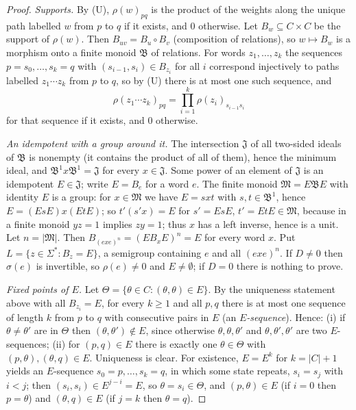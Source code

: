 \begin{proof}
\emph{Supports.} By (U), $\rho(w)_{pq}$ is the product of the weights along the unique path labelled
$w$ from $p$ to $q$ if it exists, and $0$ otherwise. Let $B_w\subseteq C\times C$ be the support of
$\rho(w)$. Then $B_{uv}=B_u\circ B_v$ (composition of relations), so $w\mapsto B_w$ is a morphism
onto a finite monoid $\mathfrak B$ of relations. For words $z_1,\ldots,z_k$ the sequences
$p=s_0,\ldots,s_k=q$ with $(s_{i-1},s_i)\in B_{z_i}$ for all $i$ correspond injectively to paths
labelled $z_1\cdots z_k$ from $p$ to $q$, so by (U) there is at most one such sequence, and
\begin{equation}\label{eq:singleterm}
\rho(z_1\cdots z_k)_{pq}=\textstyle\prod_{i=1}^k\rho(z_i)_{s_{i-1}s_i}
\end{equation}
for that sequence if it exists, and $0$ otherwise.

\emph{An idempotent with a group around it.} The intersection $\mathfrak J$ of all two-sided ideals of
$\mathfrak B$ is nonempty (it contains the product of all of them), hence the minimum ideal, and
$\mathfrak B^1x\mathfrak B^1=\mathfrak J$ for every $x\in\mathfrak J$. Some power of an element of
$\mathfrak J$ is an idempotent $E\in\mathfrak J$; write $E=B_e$ for a word $e$. The finite monoid
$\mathfrak M=E\mathfrak BE$ with identity $E$ is a group: for $x\in\mathfrak M$ we have
$E=sxt$ with $s,t\in\mathfrak B^1$, hence $E=(EsE)x(EtE)$; so $t'(s'x)=E$ for
$s'=EsE$, $t'=EtE\in\mathfrak M$, because in a finite monoid $yz=1$ implies $zy=1$; thus $x$ has a
left inverse, hence is a unit. Let $n=|\mathfrak M|$. Then $B_{(exe)^n}=(EB_xE)^n=E$ for every word
$x$. Put $L=\{z\in\Sigma^*:B_z=E\}$, a semigroup containing $e$ and all $(exe)^n$. If $D\ne0$ then
$\sigma(e)$ is invertible, so $\rho(e)\ne0$ and $E\ne\emptyset$; if $D=0$ there is nothing to prove.

\emph{Fixed points of $E$.} Let $\Theta=\{\theta\in C:(\theta,\theta)\in E\}$. By the uniqueness statement above with
all $B_{z_i}=E$, for every $k\ge1$ and all $p,q$ there is at most one sequence of length $k$ from $p$
to $q$ with consecutive pairs in $E$ (an \emph{$E$-sequence}). Hence:
(i) if $\theta\ne\theta'$ are in $\Theta$ then $(\theta,\theta')\notin E$, since otherwise $\theta,\theta,\theta'$ and $\theta,\theta',\theta'$ are two
$E$-sequences;
(ii) for $(p,q)\in E$ there is exactly one $\theta\in\Theta$ with $(p,\theta),(\theta,q)\in E$. Uniqueness is clear.
For existence, $E=E^{k}$ for $k=|C|+1$ yields an $E$-sequence $s_0=p,\ldots,s_k=q$, in which some
state repeats, $s_i=s_j$ with $i<j$; then $(s_i,s_i)\in E^{j-i}=E$, so $\theta=s_i\in\Theta$, and
$(p,\theta)\in E$ (if $i=0$ then $p=\theta$) and $(\theta,q)\in E$ (if $j=k$ then $\theta=q$).


\end{proof}
